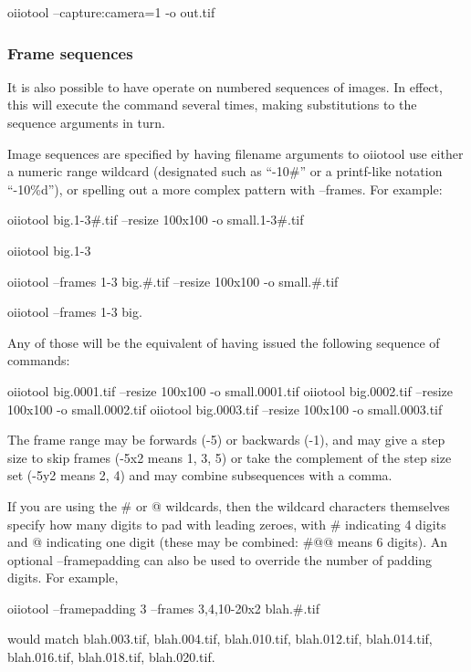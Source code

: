 \smallskip
\hspace{0.25in} {\cf oiiotool --capture:camera=1 -o out.tif}
\smallskip

\subsubsection*{Frame sequences}

It is also possible to have \oiiotool operate on numbered sequences of
images.  In effect, this will execute the \oiiotool command several
times, making substitutions to the sequence arguments in turn.

Image sequences are specified by having filename arguments to
oiiotool use either a numeric range wildcard (designated such as
``{-10\#}'' or a {\cf printf}-like notation ``{-10\%d}''),
or spelling out a more complex pattern with
{\cf --frames}.  For example:

\begin{code}
    oiiotool big.1-3#.tif --resize 100x100 -o small.1-3#.tif

    oiiotool big.1-3%

    oiiotool --frames 1-3 big.#.tif --resize 100x100 -o small.#.tif

    oiiotool --frames 1-3 big.%
\end{code}

\noindent Any of those will be the equivalent of having issued the following
sequence of commands:

\begin{code}
    oiiotool big.0001.tif --resize 100x100 -o small.0001.tif
    oiiotool big.0002.tif --resize 100x100 -o small.0002.tif
    oiiotool big.0003.tif --resize 100x100 -o small.0003.tif
\end{code}

The frame range may be forwards ({-5}) or backwards ({-1}),
and may give a step size to skip frames ({-5x2} means 1, 3, 5) or
take the complement of the step size set ({-5y2} means 2, 4) and
may combine subsequences with a comma.

If you are using the {\cf \#} or {\cf @} wildcards, then
the wildcard characters themselves specify how many digits to pad
with leading zeroes, with {\cf \#} indicating 4 digits and {\cf @}
indicating one digit (these may be combined: {\cf \#@@} means 6 digits).
An optional {\cf --framepadding} can also be used to override the number
of padding digits.
For example,
\begin{code}
    oiiotool --framepadding 3 --frames 3,4,10-20x2 blah.#.tif
\end{code}
\noindent would match {\cf blah.003.tif}, {\cf blah.004.tif},
{\cf blah.010.tif}, {\cf blah.012.tif}, 
{\cf blah.014.tif}, {\cf blah.016.tif}, {\cf blah.018.tif}, 
{\cf blah.020.tif}.

